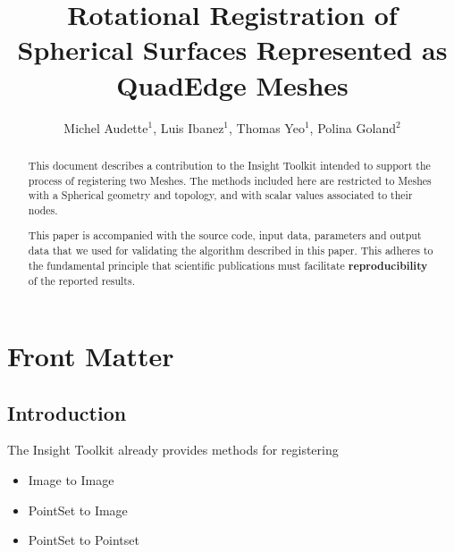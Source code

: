 \documentclass{InsightArticle}
\title{Rotational Registration of Spherical Surfaces Represented as QuadEdge Meshes}
\author{Michel Audette$^{1}$, Luis Ibanez$^{1}$, Thomas Yeo$^{1}$, Polina Goland$^{2}$}
\newcommand{\IJhandlerIDnumber}{1338}
\begin{document}
%
% 
\IJhandlefooter{\IJhandlerIDnumber}


\ifpdf
\else
\fi


\maketitle


\ifhtml
\chapter*{Front Matter\label{front}}
\fi


\begin{abstract}
\noindent
This document describes a contribution to the Insight Toolkit intended to
support the process of registering two Meshes.  The methods included here are
restricted to Meshes with a Spherical geometry and topology, and with scalar
values associated to their nodes.

This paper is accompanied with the source code, input data, parameters and
output data that we used for validating the algorithm described in this paper.
This adheres to the fundamental principle that scientific publications must
facilitate \textbf{reproducibility} of the reported results.
\end{abstract}

\tableofcontents

\section{Introduction}

The Insight Toolkit already provides methods for registering

\begin{itemize}
\item Image to Image
\item PointSet to Image
\item PointSet to Pointset
\end{itemize}
\end{document}
